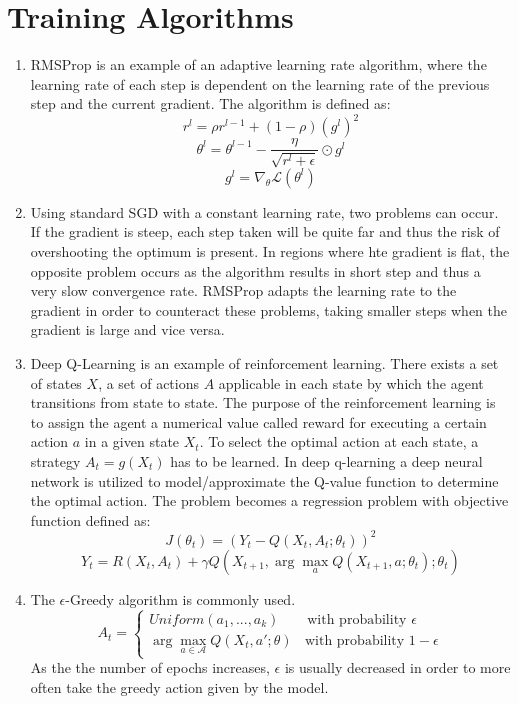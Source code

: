 \documentclass{article}
\begin{document}
\section{Training Algorithms}
\begin{enumerate}[label=(\alph*)]
	\item RMSProp is an example of an adaptive learning rate algorithm, where the learning rate of each step is dependent on the learning rate of the previous step and the current gradient. The algorithm is defined as: $$r^{l} = \rho r^{l-1} + (1-\rho)(g^{l})^2$$ $$\theta^{l} = \theta^{l-1} - \frac{\eta}{\sqrt{r^l + \epsilon}}\odot g^{l}$$ $$g^l = \nabla_{\theta} \mathcal{L}(\theta^l)$$
	\item Using standard SGD with a constant learning rate, two problems can occur. If the gradient is steep, each step taken will be quite far and thus the risk of overshooting the optimum is present. In regions where hte gradient is flat, the opposite problem occurs as the algorithm results in short step and thus a very slow convergence rate. RMSProp adapts the learning rate to the gradient in order to counteract these problems, taking smaller steps when the gradient is large and vice versa. 
	\item Deep Q-Learning is an example of reinforcement learning. There exists a set of states $X$, a set of actions $A$ applicable in each state by which the agent transitions from state to state. The purpose of the reinforcement learning is to assign the agent a numerical value called reward for executing a certain action $a$ in a given state $X_t$. To select the optimal action at each state, a strategy $A_t = g(X_t)$ has to be learned. In deep q-learning a deep neural network is utilized to model/approximate the Q-value function to determine the optimal action. The problem becomes a regression problem with objective function defined as: $$J(\theta_t) = \left(Y_t - Q(X_t, A_t; \theta_t)\right)^2$$ $$Y_t = R(X_t, A_t) + \gamma Q\left(X_{t+1}, \arg \max_{a} Q(X_{t+1}, a; \theta_t); \theta_t\right)$$
	\item The $\epsilon$-Greedy algorithm is commonly used. 
	$$A_t = \begin{cases} Uniform(a_1, ..., a_k) \ \ \ \ \ \ \ \ \ \text{with probability $\epsilon$} \\ \arg \max_{a \in \mathcal{A}}Q(X_t, a'; \theta) \ \ \ \ \text{with probability $1-\epsilon$} \end{cases}$$
	As the the number of epochs increases, $\epsilon$ is usually decreased in order to more often take the greedy action given by the model. 
\end{enumerate}
\end{document}

